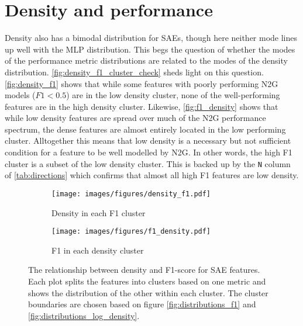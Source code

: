 \section{Density and performance}
Density also has a bimodal distribution for \acp{SAE}, though here neither mode lines up well with the \ac{MLP} distribution.
This begs the question of whether the modes of the performance metric distributions are related to the modes of the density distribution.
\autoref{fig:density_f1_cluster_check} sheds light on this question.
\autoref{fig:density_f1} shows that while some features with poorly performing \ac{N2G} models ($F1<0.5$) are in the low density cluster, none of the well-performing features are in the high density cluster.
Likewise, \autoref{fig:f1_density} shows that while low density features are spread over much of the \ac{N2G} performance spectrum, the dense features are almost entirely located in the low performing cluster.
Alltogether this means that low density is a necessary but not sufficient condition for a feature to be well modelled by \ac{N2G}.
In other words, the high F1 cluster is a subset of the low density cluster.
This is backed up by the \texttt{N} column of \autoref{tab:directions} which confirms that almost all high F1 features are low density.

\begin{figure}[ht]
    \centering
    
    \begin{subfigure}[b]{0.45\textwidth}
        \centering
        \texttt{[image: images/figures/density\_f1.pdf]}
        \caption{Density in each F1 cluster}
        \label{fig:density_f1}
    \end{subfigure}
    \begin{subfigure}[b]{0.45\textwidth}
        \centering
        \texttt{[image: images/figures/f1\_density.pdf]}
        \caption{F1 in each density cluster}
        \label{fig:f1_density}
    \end{subfigure}
    
    \caption{The relationship between density and F1-score for \ac{SAE} features.
    Each plot splits the features into clusters based on one metric and shows the distribution of the other within each cluster.
    The cluster boundaries are chosen based on figure \ref{fig:distributions_f1} and \ref{fig:distributions_log_density}.}
    \label{fig:density_f1_cluster_check}
\end{figure}

